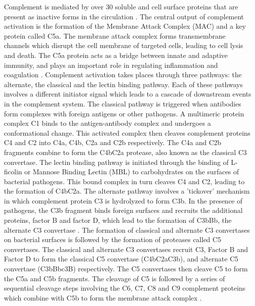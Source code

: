 \documentclass[12pt]{article}
\begin{document}
Complement is mediated by over 30 soluble and cell surface proteins that are present as inactive forms in the circulation \cite{walport2001complement}.
The central output of complement activation is the formation of the Membrane Attack Complex (MAC) and a key protein called C5a.
The membrane attack complex forms transmembrane channels which disrupt the cell membrane of targeted cells, leading to cell lysis and death.
The C5a protein acts as a bridge between innate and adaptive immunity, and plays an important role in regulating inflammation and coagulation \cite{sarma2011complement}.
Complement activation takes places through three pathways: the alternate, the classical and the lectin binding pathway.
Each of these pathways involves a different initiator signal which leads to a cascade of downstream events in the complement system.
The classical pathway is triggered when antibodies form complexes with foreign antigens or other pathogens.
A multimeric protein complex C1 binds to the antigen-antibody complex and undergoes a conformational change.
This activated complex then cleaves complement proteins C4 and C2 into C4a, C4b, C2a and C2b respectively.
The C4a and C2b fragments combine to form the C4bC2a protease, also known as the classical C3 convertase.
The lectin binding pathway is initiated through the binding of L-ficolin or Mannose Binding Lectin (MBL) to carbohydrates on the surfaces of bacterial pathogens.
This bound complex in turn cleaves C4 and C2, leading to the formation of C4bC2a.
The alternate pathway involves a 'tickover' mechanism in which complement protein C3 is hydrolyzed to form C3b.
In the presence of pathogens, the C3b fragment binds foreign surfaces and recruits the additional proteins, factor B and factor D, which lead to the formation of C3bBb, the alternate C3 convertase \cite{pangburn1984alternative}.
The formation of classical and alternate C3 convertases on bacterial surfaces is followed by the formation of proteases called C5 convertases.
The classical and alternate C3 convertases recruit C3, Factor B and Factor D to form the classical C5 convertase (C4bC2aC3b), and alternate C5 convertase (C3bBbc3B) respectively.
The C5 convertases then cleave C5 to form the C5a and C5b fragments.
The cleavage of C5 is followed by a series of sequential cleavage steps involving the C6, C7, C8 and C9 complement proteins
which combine with C5b to form the membrane attack complex \cite{ricklin2010complement}.
\end{document}
